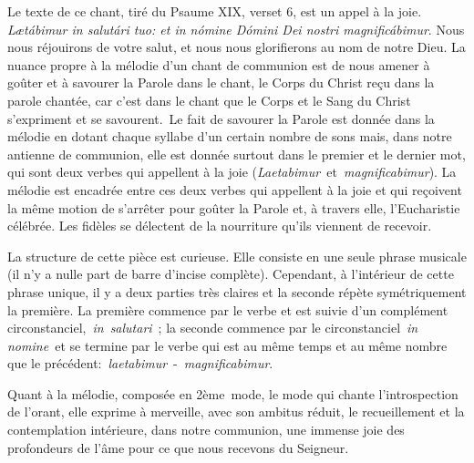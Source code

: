 \documentclass[Session2026.tex]{subfiles}
\begin{document}
Le texte de ce chant, tiré du Psaume XIX, verset 6, est un appel à la
joie. \emph{Lætábimur in salutári tuo: et in nómine Dómini Dei nostri
magnificábimur}. Nous nous réjouirons de votre salut, et nous nous
glorifierons au nom de notre Dieu. La nuance propre à la mélodie d'un
chant de communion est de nous amener à goûter et à savourer la Parole
dans le chant, le Corps du Christ reçu dans la parole chantée, car c'est
dans le chant que le Corps et le Sang du Christ s'expriment et se
savourent.~Le fait de savourer la Parole est donnée dans la mélodie en
dotant chaque syllabe d'un certain nombre de sons mais, dans notre
antienne de communion, elle est donnée surtout dans le premier et le
dernier mot, qui sont deux verbes qui appellent à la joie
(\emph{Laetabimur~}et\emph{~magnificabimur}). La mélodie est encadrée
entre ces deux verbes qui appellent à la joie et qui reçoivent la même
motion de s'arrêter pour goûter la Parole et, à travers elle,
l'Eucharistie célébrée. Les fidèles se délectent de la nourriture qu'ils
viennent de recevoir.

La structure de cette pièce est curieuse. Elle consiste en une seule
phrase musicale (il n'y a nulle part de barre d'incise complète).
Cependant, à l'intérieur de cette phrase unique, il y a deux parties
très claires et la seconde répète symétriquement la première. La
première commence par le verbe et est suivie d'un complément
circonstanciel,~\emph{in}~\emph{salutari}~; la seconde commence par le
circonstanciel~\emph{in nomine~}et se termine par le verbe qui est au
même temps et au même nombre que le précédent:~\emph{laetabimur}~-~\emph{magnificabimur}.

Quant à la mélodie, composée en 2ème~mode, le mode qui chante
l'introspection de l'orant, elle exprime à merveille, avec son ambitus
réduit, le recueillement et la contemplation intérieure, dans notre
communion, une immense joie des profondeurs de l'âme pour ce que nous
recevons du Seigneur.
\end{document}
